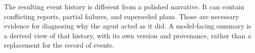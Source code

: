 The resulting event history is different from a polished narrative. It can contain conflicting reports, partial failures, and superseded plans. Those are necessary evidence for diagnosing why the agent acted as it did. A model-facing summary is a derived view of that history, with its own version and provenance, rather than a replacement for the record of events.

